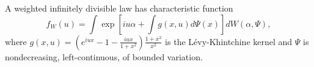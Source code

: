 A weighted infinitely divisible law has characteristic function
$$f_W(u) = \int \exp\left[ iu\alpha + \int g(x, u) d\Psi(x) \right] dW(\alpha, \Psi),$$
where $g(x, u) = (e^{iux} - 1 - \frac{iux}{1+x^2}) \frac{1+x^2}{x^2}$ is the Lévy-Khintchine kernel and $\Psi$ is nondecreasing, left-continuous, of bounded variation.
